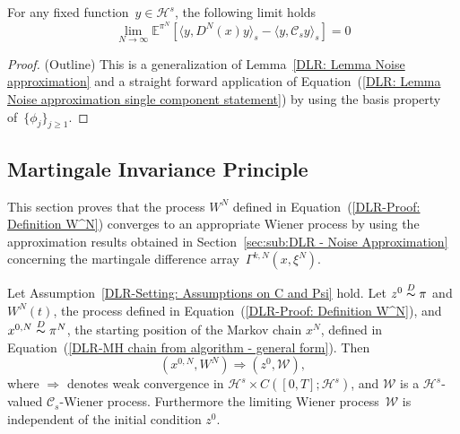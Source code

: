 \begin{cor}\autocite[Corollary 4.9]{Pillai2012} 
  \label{DLR: Corollary Noise approximation}
 For any fixed function~$y \in \mathcal{H}^s$, the following limit holds
 \begin{equation}
  \lim_{N \to \infty} \mathbb{E}^{\pi^N}[\langle y, D^N(x) y \rangle_s - \langle y, \mathcal{C}_s y \rangle_s] = 0
 \end{equation}

\end{cor}
\begin{proof}(Outline)
  This is a generalization of Lemma~\ref{DLR: Lemma Noise approximation} and a straight forward application of Equation~(\ref{DLR: Lemma Noise approximation single component statement}) by using the basis property of~$\{ \phi_j \}_{j \geq 1} $.
\end{proof}


 
\subsection{Martingale Invariance Principle}
\label{Martingale invariance principle}

This section proves that the process $ W^{N} $ defined in Equation~(\ref{DLR-Proof: Definition W^N}) converges to an appropriate Wiener process by using the approximation results obtained in Section~\ref{sec:sub:DLR - Noise Approximation} concerning the martingale difference array~$\Gamma^{k,N}(x, \xi^N)$.

\begin{proposition}
 \label{Invariance principle}
 Let Assumption~\ref{DLR-Setting: Assumptions on C and Psi} hold. Let $ z^0 \stackrel{D}{\thicksim} \pi $ and $ W^{N}(t) $, the process defined in Equation~(\ref{DLR-Proof: Definition W^N}), and $ x^{0,N} \stackrel{D}{\thicksim} \pi^{N} $, the starting position of the Markov chain $ x^{N} $, defined in Equation~(\ref{DLR-MH chain from algorithm - general form}). Then
 \begin{equation}
  (x^{0,N}, W^{N}) \Longrightarrow (z^0, \mathcal{W}),
 \end{equation}
 where $ \Longrightarrow $ denotes weak convergence in $ \mathcal{H}^s \times C \left( [0,T]; \mathcal{H}^s \right) $, and $ \mathcal{W}$ is a $ \mathcal{H}^s $-valued  $ \mathcal{C}_s $-Wiener process. Furthermore the limiting Wiener process~$ \mathcal{W} $ is independent of the initial condition $ z^0 $.
 
\end{proposition}



